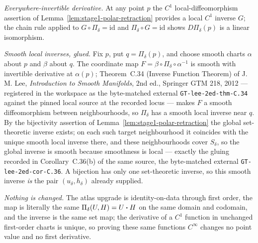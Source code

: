 \emph{Everywhere-invertible derivative.} At any point $p$ the $C^{1}$
local-diffeomorphism assertion of Lemma~\ref{lem:stage1-polar-retraction} provides a local
$C^{1}$ inverse $G$; the chain rule applied to $G\circ\Pi_\delta=\mathrm{id}$ and
$\Pi_\delta\circ G=\mathrm{id}$ shows $D\Pi_\delta(p)$ is a linear isomorphism.

\emph{Smooth local inverses, glued.} Fix $p$, put $q=\Pi_\delta(p)$, and choose smooth
charts $\alpha$ about $p$ and $\beta$ about $q$. The coordinate map
$F=\beta\circ\Pi_\delta\circ\alpha^{-1}$ is smooth with invertible derivative at
$\alpha(p)$; Theorem~C.34 (Inverse Function Theorem) of J.\,M. Lee, \emph{Introduction to
Smooth Manifolds}, 2nd ed., Springer GTM 218, 2012 --- registered in the workspace as the
byte-matched external \texttt{GT-lee-2ed-thm-C.34} against the pinned local source at the
recorded locus --- makes $F$ a smooth diffeomorphism between neighbourhoods, so
$\Pi_\delta$ has a smooth local inverse near $q$. By the bijectivity assertion of
Lemma~\ref{lem:stage1-polar-retraction} the global set-theoretic inverse exists; on each
such target neighbourhood it coincides with the unique smooth local inverse there, and
these neighbourhoods cover $S_\delta$, so the global inverse is smooth because smoothness
is local --- exactly the gluing recorded in Corollary~C.36(b) of the same source, the
byte-matched external \texttt{GT-lee-2ed-cor-C.36}. A bijection has only one set-theoretic
inverse, so this smooth inverse \emph{is} the pair $(u_\delta,h_\delta)$ already supplied.

\emph{Nothing is changed.} The atlas upgrade is identity-on-data through first order, the
map is literally the same $\Pi_\delta(U,H)=U\mathbin{\bm{\cdot}} H$ on the same domain and codomain, and
the inverse is the same set map; the derivative of a $C^{1}$ function in unchanged
first-order charts is unique, so proving these same functions $C^{\infty}$ changes no
point value and no first derivative.

